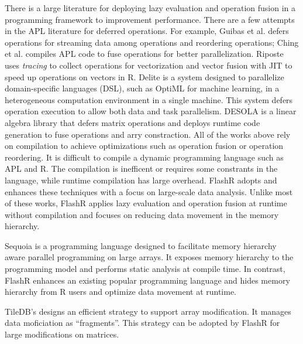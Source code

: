 There is a large literature for deploying lazy evaluation and operation fusion
in a programming framework to improvement performance. There are a few attempts
in the APL literature for deferred operations. For example, Guibas et al.
\cite{Guibas78} defers operations for streaming data among operations and
reordering operations; Ching et al. \cite{Ching12} compiles APL code
to fuse operations for better parallelization. Riposte \cite{riposte} uses
\textit{tracing} to collect operations for vectorization and vector fusion
with JIT to speed up operations on vectors in R.
Delite \cite{delite} is a system designed to parallelize domain-specific languages
(DSL), such as OptiML \cite{optiml} for machine learning, in a heterogeneous
computation environment in a single machine. This system
defers operation execution to allow both data and task parallelism.
DESOLA \cite{desola} is a linear algebra library that defers matrix operations
and deploys runtime code generation to fuse operations and arry constraction.
All of the works above rely on compilation to achieve optimizations such as
operation fusion or operation reordering.
It is difficult to compile a dynamic programming language such as APL and R.
The compilation is inefficent or requires some constrants in the language,
while runtime compilation has large overhead.
FlashR adopts and enhances these techniques with a focus on large-scale
data analysis. Unlike most of these works, FlashR applies lazy evaluation
and operation fusion at runtime without compilation and focuses on reducing
data movement in the memory hierarchy.


Sequoia \cite{sequoia} is a programming language designed to facilitate
memory hierarchy aware parallel programming on large arrays.
It exposes memory hierarchy to the programming model and performs static
analysis at compile time. In contrast, FlashR enhances an existing popular
programming language and hides memory
hierarchy from R users and optimize data movement at runtime.

TileDB's \cite{Papadopoulos16} designs an efficient strategy to support
array modification.
It manages data moficiation as ``fragments''. This strategy can be adopted by
FlashR for large modifications on matrices.
